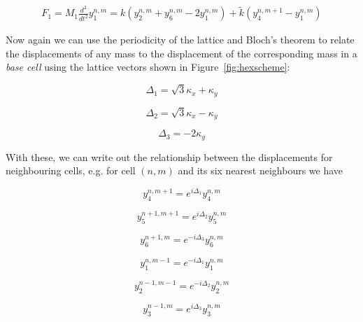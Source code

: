 \begin{align}
  F_1=M_1\frac{d^{2}}{dt^{2}}y_1^{n,m}
      =k\left(y_2^{n,m}+y_6^{n,m}-2y_1^{n,m}\right)+
       \tilde{k}\left(y_4^{n,m+1}-y_1^{n,m}\right)
\label{eq:2dH1}
\end{align}

Now again we can use the periodicity of the lattice and Bloch's theorem to
relate the displacements of any mass to the displacement of the corresponding
mass in a \textit{base cell} using the lattice vectors shown in
Figure~\ref{fig:hexscheme}:

\begin{equation}
  \Delta_1=\sqrt{3}\kappa_x+\kappa_y
\label{eq:hexvec1}
\end{equation}

\begin{equation}
  \Delta_2=\sqrt{3}\kappa_x-\kappa_y
\label{eq:hexvec2}
\end{equation}

\begin{equation}
  \Delta_3=-2\kappa_y
\label{eq:hexvec3}
\end{equation}

With these, we can write out the relationship between the displacements for
neighbouring cells, e.g. for cell $(n,m)$ and its six nearest neighbours we
have

\begin{equation}
  y_4^{n,m+1}=e^{i\Delta_1}y_4^{n,m}
\label{eq:hexrelate4}
\end{equation}

\begin{equation}
  y_5^{n+1,m+1}=e^{i\Delta_2}y_5^{n,m}
\label{eq:hexrelate5}
\end{equation}

\begin{equation}
  y_6^{n+1,m}=e^{-i\Delta_3}y_6^{n,m}
\label{eq:hexrelate6}
\end{equation}

\begin{equation}
  y_1^{n,m-1}=e^{-i\Delta_1}y_1^{n,m}
\label{eq:hexrelate1}
\end{equation}

\begin{equation}
  y_2^{n-1,m-1}=e^{-i\Delta_2}y_2^{n,m}
\label{eq:hexrelate2}
\end{equation}

\begin{equation}
  y_3^{n-1,m}=e^{i\Delta_3}y_3^{n,m}
\label{eq:hexrelate3}
\end{equation}

